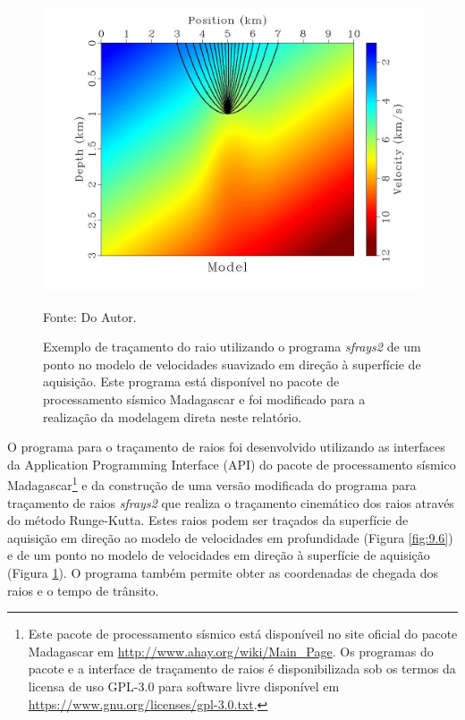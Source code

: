 \begin{figure}[H]
\caption{Exemplo de traçamento do raio utilizando o programa \textit{sfrays2}
de um ponto no modelo de velocidades suavizado em direção à superfície de aquisição.
Este programa está disponível no pacote de processamento sísmico Madagascar e foi
modificado para a realização da modelagem direta neste relatório.}
\begin{center}
\includegraphics[scale=0.3]{images/raioleque.jpg}
\vspace{-0.3cm}
\end{center}
\begin{center}
 Fonte: Do Autor.
\end{center}
\label{fig:9.7}
\end{figure}

O programa para o traçamento de raios foi desenvolvido
utilizando as interfaces da Application Programming Interface (API)
do pacote de processamento sísmico Madagascar\footnote{Este pacote de processamento sísmico
está disponíveil no site oficial do pacote Madagascar em \url{http://www.ahay.org/wiki/Main_Page}. 
Os programas do pacote e a interface de traçamento de raios é disponibilizada sob
os termos da licensa de uso GPL-3.0 para software livre disponível
em \url{https://www.gnu.org/licenses/gpl-3.0.txt}.} \cite{madagascar}
e da construção de uma versão modificada do programa para traçamento de raios 
\textit{sfrays2} que realiza o traçamento cinemático dos raios
através do método Runge-Kutta. Estes raios podem ser traçados da superfície de aquisição em
direção ao modelo de velocidades em profundidade (Figura \ref{fig:9.6}) e de um
ponto no modelo de velocidades em direção à superfície de aquisição (Figura \ref{fig:9.7}).
O programa também permite obter as coordenadas de chegada dos raios e o tempo de trânsito.

